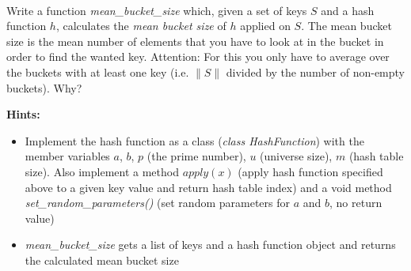  \\
Write a function \textit{mean\_bucket\_size} which,
given a set of keys $S$ and a hash function $h$,
calculates the \textit{mean bucket size} of $h$ applied on $S$.
The mean bucket size is the mean number of elements that you have to look at
in the bucket in order to find the wanted key.
Attention: For this you only have to average over the buckets with at least
one key (i.e. $\|S\|$ divided by the number of non-empty buckets).
Why?

\textbf{Hints:}
\begin{itemize}
\item Implement the hash function as a class (\emph{class HashFunction}) with the member variables $a$, $b$, $p$ (the prime number), $u$ (universe size), $m$ (hash table size). Also implement a method $apply(x)$ (apply hash function specified above to a given key value and return hash table index) and a void method \emph{set\_random\_parameters()} (set random parameters for $a$ and $b$, no return value)
\item \emph{mean\_bucket\_size} gets a list of keys and a hash function object and returns the calculated mean bucket size
\end{itemize}

